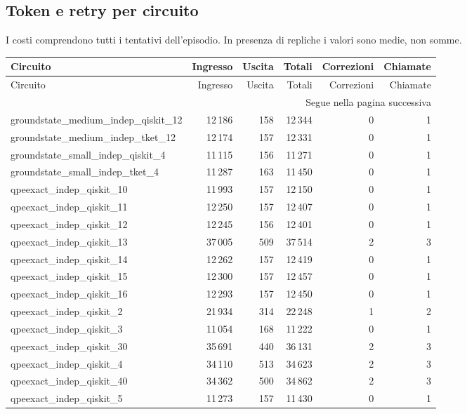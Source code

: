 \subsection{Token e retry per circuito}
I costi comprendono tutti i tentativi dell’episodio. In presenza di repliche i valori sono medie, non somme.
\begingroup\footnotesize
\setlength{\tabcolsep}{5pt}
\begin{longtable}{lrrrrr}
\toprule
Circuito & Ingresso & Uscita & Totali & Correzioni & Chiamate \\
\midrule
\endfirsthead
\toprule
Circuito & Ingresso & Uscita & Totali & Correzioni & Chiamate \\
\midrule\endhead
\midrule\multicolumn{6}{r}{\footnotesize Segue nella pagina successiva}\\
\endfoot
\bottomrule\endlastfoot
groundstate\_medium\_indep\_qiskit\_12 & 12\,186 & 158 & 12\,344 & 0 & 1 \\
groundstate\_medium\_indep\_tket\_12 & 12\,174 & 157 & 12\,331 & 0 & 1 \\
groundstate\_small\_indep\_qiskit\_4 & 11\,115 & 156 & 11\,271 & 0 & 1 \\
groundstate\_small\_indep\_tket\_4 & 11\,287 & 163 & 11\,450 & 0 & 1 \\
qpeexact\_indep\_qiskit\_10 & 11\,993 & 157 & 12\,150 & 0 & 1 \\
qpeexact\_indep\_qiskit\_11 & 12\,250 & 157 & 12\,407 & 0 & 1 \\
qpeexact\_indep\_qiskit\_12 & 12\,245 & 156 & 12\,401 & 0 & 1 \\
qpeexact\_indep\_qiskit\_13 & 37\,005 & 509 & 37\,514 & 2 & 3 \\
qpeexact\_indep\_qiskit\_14 & 12\,262 & 157 & 12\,419 & 0 & 1 \\
qpeexact\_indep\_qiskit\_15 & 12\,300 & 157 & 12\,457 & 0 & 1 \\
qpeexact\_indep\_qiskit\_16 & 12\,293 & 157 & 12\,450 & 0 & 1 \\
qpeexact\_indep\_qiskit\_2 & 21\,934 & 314 & 22\,248 & 1 & 2 \\
qpeexact\_indep\_qiskit\_3 & 11\,054 & 168 & 11\,222 & 0 & 1 \\
qpeexact\_indep\_qiskit\_30 & 35\,691 & 440 & 36\,131 & 2 & 3 \\
qpeexact\_indep\_qiskit\_4 & 34\,110 & 513 & 34\,623 & 2 & 3 \\
qpeexact\_indep\_qiskit\_40 & 34\,362 & 500 & 34\,862 & 2 & 3 \\
qpeexact\_indep\_qiskit\_5 & 11\,273 & 157 & 11\,430 & 0 & 1 \\

\end{longtable}
